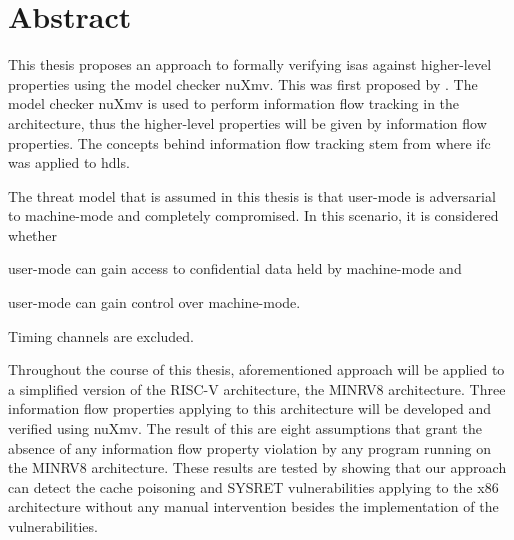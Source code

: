 \chapter*{\centering Abstract}

This thesis proposes an approach to formally verifying \glspl{isa} against higher-level properties using the model checker nuXmv.
This was first proposed by \cite{Reid17}.
The model checker nuXmv is used to perform information flow tracking in the architecture, thus the higher-level properties will be given by information flow properties.
The concepts behind information flow tracking stem from \cite{Ferraiuolo17} where \gls{ifc} was applied to \glspl{hdl}.

The threat model that is assumed in this thesis is that user-mode is adversarial to machine-mode and completely compromised.
In this scenario, it is considered whether
\begin{enumerate*}[label=\alph*)]
    \item user-mode can gain access to confidential data held by machine-mode and
    \item user-mode can gain control over machine-mode.
\end{enumerate*}
Timing channels are excluded.

Throughout the course of this thesis, aforementioned approach will be applied to a simplified version of the RISC-V architecture, the MINRV8 architecture.
Three information flow properties applying to this architecture will be developed and verified using nuXmv.
The result of this are eight assumptions that grant the absence of any information flow property violation by any program running on the MINRV8 architecture.
These results are tested by showing that our approach can detect the cache poisoning \cite{Wojtczuk09} and SYSRET vulnerabilities \cite{SYSRET-vuln,Dunlap19} applying to the x86 architecture without any manual intervention besides the implementation of the vulnerabilities.
